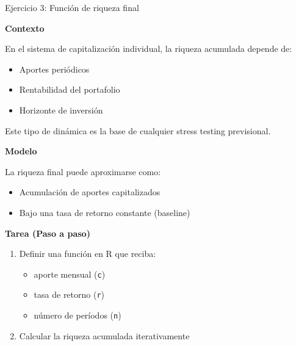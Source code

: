 \documentclass[10pt]{beamer}
\begin{document}
\begin{frame}{Ejercicio 3: Función de riqueza final}

\textbf{Contexto}

\vspace{0.2cm}
En el sistema de capitalización individual, la riqueza acumulada depende de:
\begin{itemize}
\item Aportes periódicos
\item Rentabilidad del portafolio
\item Horizonte de inversión
\end{itemize}

Este tipo de dinámica es la base de cualquier stress testing previsional.

\vspace{0.4cm}

\textbf{Modelo}

La riqueza final puede aproximarse como:

\begin{itemize}
\item Acumulación de aportes capitalizados
\item Bajo una tasa de retorno constante (baseline)
\end{itemize}

\vspace{0.3cm}

\textbf{Tarea (Paso a paso)}

\begin{enumerate}
\item Definir una función en R que reciba:
\begin{itemize}
\item aporte mensual (\texttt{c})
\item tasa de retorno (\texttt{r})
\item número de períodos (\texttt{n})
\end{itemize}

\item Calcular la riqueza acumulada iterativamente
\end{enumerate}

\end{frame}

\end{document}
